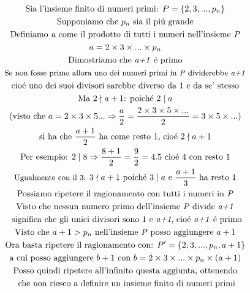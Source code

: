 \documentclass[twoside]{article} %
\begin{document}
	\begin{mdframed}[linewidth=1.5pt]
	\\
		\begin{gather*}
			\text{Sia l'insieme finito di numeri primi: } P=\{2,3,...,p_n\}\\
			\text{Supponiamo che }p_n\text{ sia il pi\'u grande}\\
			\text{Definiamo \textit{a} come il prodotto di tutti i numeri nell'insieme \textit{P}}\\
			a = 2\times 3 \times ...\times p_n\\
			\text{Dimostriamo che \textit{a+1} \'e primo}\\
			\text{\small Se non fosse primo allora uno dei numeri primi in \textit{P} dividerebbe \textit{a+1}}\\
			\text{cio\'e uno dei suoi divisori sarebbe diverso da 1 e da se' stesso}\\
			\text{Ma }2\nmid a+1\text{: poich\'e }2\mid a\\
			\text{(visto che } a=2\times3\times5...\Rightarrow \frac{a}{2}=\frac{2\times 3\times 5\times...}{2}=3\times5\times...\text{)}\\
			 \text{si ha che } \frac{a+1}{2} \text{ ha come resto 1, cio\'e }2\nmid a+1\\
			\text{Per esempio: }2\mid 8\Rightarrow \frac{8+1}{2}=\frac{9}{2}=4.5\text{ cio\'e 4 con resto 1}\\
			\text{\small Ugualmente con il 3: }3\nmid a+1\text{ poich\'e }3\mid a\text{ e } \frac{a+1}{3} \text{ ha resto 1}\\
			\text{Possiamo ripetere il ragionamento con tutti i numeri in \textit{P}}\\		
			\text{Visto che nessun numero primo dell'insieme \textit{P} divide \textit{a+1}}\\
			\text{ significa che gli unici divisori sono 1 e \textit{a+1}, cio\'e \textit{a+1} \'e primo}\\
			\text{Visto che }a+1>p_n\text{ nell'insieme \textit{P} posso aggiungere }a+1\\
			\text{Ora basta ripetere il ragionamento con: }P'=\{2, 3, ..., p_n,a+1\}\\
			\text{a cui posso aggiungere }b+1 \text{ con }b=2\times 3\times ...\times p_n\times (a+1)\\
			\text{Posso quindi ripetere all'infinito questa aggiunta, ottenendo}\\ 
			\text{ che non riesco a definire un insieme finito di numeri primi}
		\end{gather*}
	\end{mdframed}	
\end{document}
